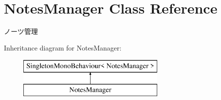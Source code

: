 \hypertarget{class_notes_manager}{}\section{Notes\+Manager Class Reference}
\label{class_notes_manager}


ノーツ管理  


Inheritance diagram for Notes\+Manager\+:\begin{figure}[H]
\begin{center}
\leavevmode
\includegraphics[height=2.000000cm]{class_notes_manager}
\end{center}
\end{figure}
